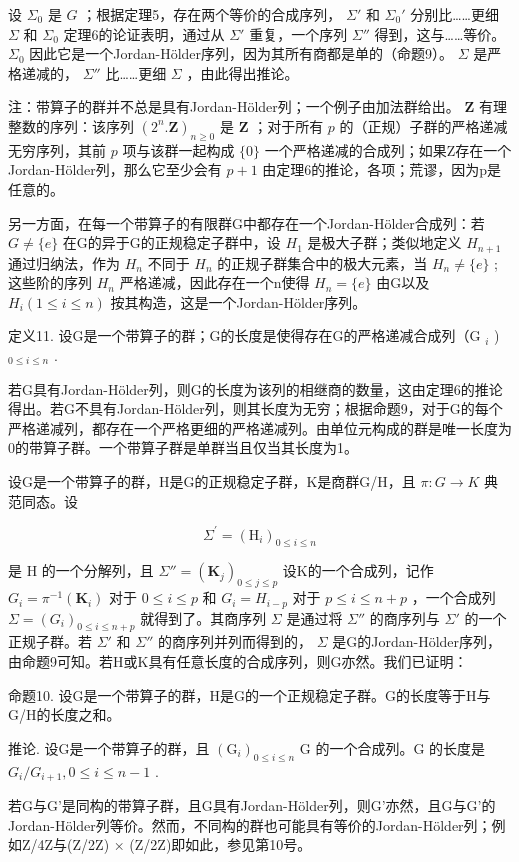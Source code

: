 设 \(\Sigma_0\) 是 \(G\) ；根据定理5，存在两个等价的合成序列， \(\Sigma'\) 和 \(\Sigma_0'\) 分别比……更细 \(\Sigma\) 和 \(\Sigma_0\) 定理6的论证表明，通过从 \(\Sigma'\) 重复，一个序列 \(\Sigma''\) 得到，这与……等价。 \(\Sigma_0\) 因此它是一个Jordan-Hölder序列，因为其所有商都是单的（命题9）。 \(\Sigma\) 是严格递减的， \(\Sigma''\) 比……更细 \(\Sigma\) ，由此得出推论。

注：带算子的群并不总是具有Jordan-Hölder列；一个例子由加法群给出。 \(\mathbf{Z}\) 有理整数的序列：该序列 \((2^{n}.\mathbf{Z})_{n\geqslant 0}\) 是 \(\mathbf{Z}\) ；对于所有 \(p\) 的（正规）子群的严格递减无穷序列，其前 \(p\) 项与该群一起构成 \(\{0\}\) 一个严格递减的合成列；如果Z存在一个Jordan-Hölder列，那么它至少会有 \(p + 1\) 由定理6的推论，各项；荒谬，因为p是任意的。

另一方面，在每一个带算子的有限群G中都存在一个Jordan-Hölder合成列：若 \(G \neq \{e\}\) 在G的异于G的正规稳定子群中，设 \(H_{1}\) 是极大子群；类似地定义 \(H_{n+1}\) 通过归纳法，作为 \(H_{n}\) 不同于 \(H_{n}\) 的正规子群集合中的极大元素，当 \(H_{n} \neq \{e\}\) ; 这些阶的序列 \(H_{n}\) 严格递减，因此存在一个n使得 \(H_{n} = \{e\}\) 由G以及 \(H_{i} (1 \leqslant i \leqslant n)\) 按其构造，这是一个Jordan-Hölder序列。

定义11. 设G是一个带算子的群；G的长度是使得存在G的严格递减合成列（G \(_{i}\) ) \(_{0 \leq i \leq n}\) .

若G具有Jordan-Hölder列，则G的长度为该列的相继商的数量，这由定理6的推论得出。若G不具有Jordan-Hölder列，则其长度为无穷；根据命题9，对于G的每个严格递减列，都存在一个严格更细的严格递减列。由单位元构成的群是唯一长度为0的带算子群。一个带算子群是单群当且仅当其长度为1。

设G是一个带算子的群，H是G的正规稳定子群，K是商群G/H，且 \(\pi: G \rightarrow K\) 典范同态。设

\[
\Sigma^ {\prime} = \left(\mathrm{H} _ {i}\right) _ {0 \leqslant i \leqslant n}
\]

是 H 的一个分解列，且 \(\Sigma'' = (\mathbf{K}_j)_{0 \leqslant j \leqslant p}\) 设K的一个合成列，记作 \(G_i = \pi^{-1}(\mathbf{K}_i)\) 对于 \(0 \leqslant i \leqslant p\) 和 \(G_i = H_{i-p}\) 对于 \(p \leqslant i \leqslant n + p\) ，一个合成列 \(\Sigma = (G_i)_{0 \leqslant i \leqslant n+p}\) 就得到了。其商序列 \(\Sigma\) 是通过将 \(\Sigma''\) 的商序列与 \(\Sigma'\) 的一个正规子群。若 \(\Sigma'\) 和 \(\Sigma''\) 的商序列并列而得到的， \(\Sigma\) 是G的Jordan-Hölder序列，由命题9可知。若H或K具有任意长度的合成序列，则G亦然。我们已证明：

命题10. 设G是一个带算子的群，H是G的一个正规稳定子群。G的长度等于H与G/H的长度之和。

推论. 设G是一个带算子的群，且 \((\mathrm{G}_{i})_{0\leqslant i\leqslant n}\) G 的一个合成列。G 的长度是 \(G_{i}/G_{i+1}, 0 \leqslant i \leqslant n - 1\) .

若G与G'是同构的带算子群，且G具有Jordan-Hölder列，则G'亦然，且G与G'的Jordan-Hölder列等价。然而，不同构的群也可能具有等价的Jordan-Hölder列；例如Z/4Z与(Z/2Z) × (Z/2Z)即如此，参见第10号。

